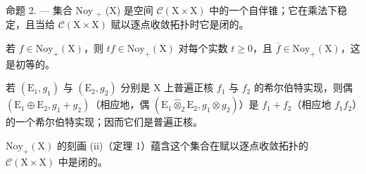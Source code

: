 命题 2. --- 集合 Noy \(_{+}\) (X) 是空间 \(\mathcal{C}(\text{X} \times \text{X})\) 中的一个自伴锥；它在乘法下稳定，且当给 \(\mathcal{C}(\text{X} \times \text{X})\) 赋以逐点收敛拓扑时它是闭的。

若 \(f \in \mathrm{Noy}_{+}(\mathrm{X})\)，则 \(tf \in \mathrm{Noy}_{+}(\mathrm{X})\) 对每个实数 \(t \geqslant 0\)，且 \(\overline{f} \in \mathrm{Noy}_{+}(\mathrm{X})\)，这是初等的。

若 \((\mathrm{E}_{1}, g_{1})\) 与 \((\mathrm{E}_{2}, g_{2})\) 分别是 X 上普遍正核 \(f_{1}\) 与 \(f_{2}\) 的希尔伯特实现，则偶 \((\mathrm{E}_{1} \oplus \mathrm{E}_{2}, g_{1} + g_{2})\)（相应地，偶 \((\mathrm{E}_{1} \widehat{\otimes}_{2} \mathrm{E}_{2}, g_{1} \otimes g_{2})\)）是 \(f_{1} + f_{2}\)（相应地 \(f_{1}f_{2}\)）的一个希尔伯特实现；因而它们是普遍正核。

\(\mathrm{Noy}_{+}(\mathrm{X})\) 的刻画 (ii)（定理 1）蕴含这个集合在赋以逐点收敛拓扑的 \(\mathcal{C}(\mathrm{X}\times\mathrm{X})\) 中是闭的。

